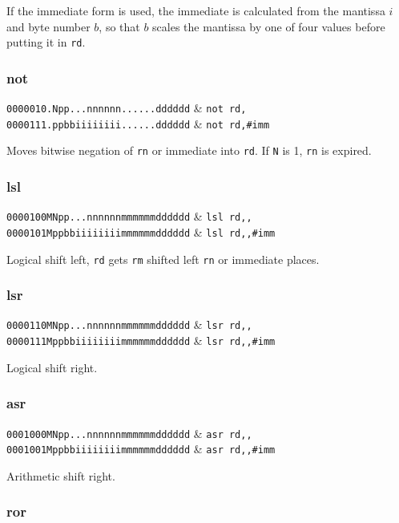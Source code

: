 If the immediate form is used, the immediate is calculated from the mantissa $i$ and byte number $b$, so that $b$ scales the mantissa by one of four values before putting it in \texttt{rd}.

\subsubsection{not}

\decfmt
\texttt{0000010.Npp...nnnnnn......dddddd} & \texttt{not rd,}\\
\texttt{0000111.ppbbiiiiiiii......dddddd} & \texttt{not rd,\#imm}
\finfmt

Moves bitwise negation of \texttt{rn} or immediate into \texttt{rd}. If \texttt{N} is 1, \texttt{rn} is expired.

\subsubsection{lsl}

\decfmt
\texttt{0000100MNpp...nnnnnnmmmmmmdddddd} & \texttt{lsl rd,,} \\
\texttt{0000101Mppbbiiiiiiiimmmmmmdddddd} & \texttt{lsl rd,,\#imm}
\finfmt

Logical shift left, \texttt{rd} gets \texttt{rm} shifted left \texttt{rn} or immediate places.

\subsubsection{lsr}

\decfmt
\texttt{0000110MNpp...nnnnnnmmmmmmdddddd} & \texttt{lsr rd,,}\\
\texttt{0000111Mppbbiiiiiiiimmmmmmdddddd} & \texttt{lsr rd,,\#imm}
\finfmt

Logical shift right.

\subsubsection{asr}

\decfmt
\texttt{0001000MNpp...nnnnnnmmmmmmdddddd} & \texttt{asr rd,,}\\
\texttt{0001001Mppbbiiiiiiiimmmmmmdddddd} & \texttt{asr rd,,\#imm}
\finfmt

Arithmetic shift right.

\subsubsection{ror}

